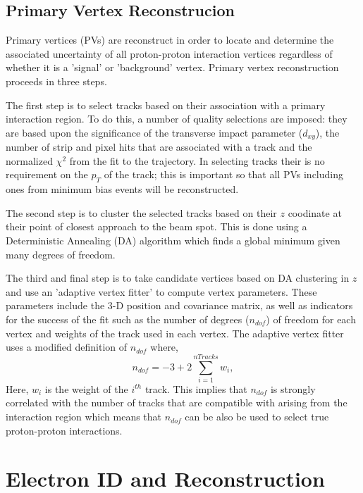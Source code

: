\subsection{Primary Vertex Reconstrucion}
Primary vertices (PVs) are reconstruct in order to locate and determine the associated uncertainty of all
proton-proton interaction vertices regardless of whether it is a 'signal' or 'background' vertex.
Primary vertex reconstruction proceeds in three steps.

The first step is to select tracks based on their association with a primary interaction region.
To do this, a number of quality selections are imposed: they are based upon the significance of the
transverse impact parameter ($d_{xy}$), the number of strip and pixel hits that are 
associated with a track and the normalized $\chi^{2}$ from the fit to the
trajectory. In selecting tracks their is no requirement on the $p_{T}$ of the track; 
this is important so that all PVs including ones from minimum bias events will be reconstructed.

The second step is to cluster the selected tracks based on their $z$ coodinate at their
point of closest approach to the beam spot. This is done using a Deterministic Annealing (DA)
algorithm which finds a global minimum given many degrees of freedom.%

The third and final step is to take candidate vertices based on DA clustering in $z$ and use
an 'adaptive vertex fitter' %
to compute vertex parameters. These parameters include the 3-D position and covariance matrix,
as well as indicators for the success of the fit such as the number of degrees ($n_{dof}$) of freedom for
each vertex and weights of the track used in each vertex. The adaptive vertex fitter
uses a modified definition of $n_{dof}$ where,
\begin{equation}
n_{dof} = -3+2\sum^{nTracks}_{i=1} w_{i},
\end{equation}
Here, $w_{i}$ is the weight of the $i^{th}$ track. This implies that $n_{dof}$ is strongly
correlated with the number of tracks that are compatible with arising from the interaction
region which means that $n_{dof}$ can be also be used to select true proton-proton interactions.
\section{Electron ID and Reconstruction}


